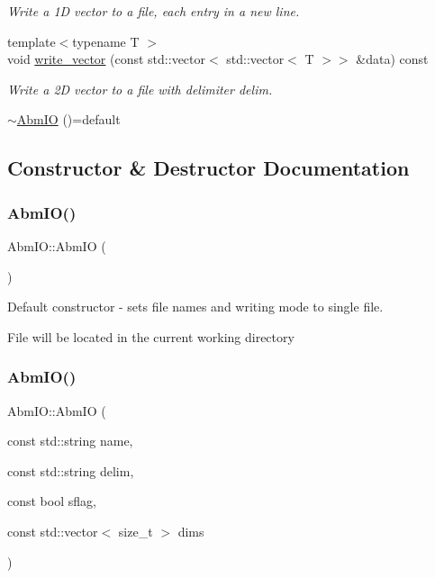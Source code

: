 \begin{DoxyCompactItemize}
\begin{DoxyCompactList}\small\item\em Write a 1D vector to a file, each entry in a new line. \end{DoxyCompactList}\item 
{\footnotesize template$<$typename T $>$ }\\void \hyperlink{classAbmIO_a3d630a2352e1e9e0337c419637f16060}{write\+\_\+vector} (const std\+::vector$<$ std\+::vector$<$ T $>$$>$ \&data) const
\begin{DoxyCompactList}\small\item\em Write a 2D vector to a file with delimiter delim. \end{DoxyCompactList}\item 
\hyperlink{classAbmIO_a134869d45f88440b1aa7580c8604a3d3}{$\sim$\+Abm\+IO} ()=default
\end{DoxyCompactItemize}


\subsection{Constructor \& Destructor Documentation}
\mbox{\label{classAbmIO_abe7ea84f8ad3a29b664a03343b058dde}} 
\subsubsection{\texorpdfstring{Abm\+I\+O()}{AbmIO()}\hspace{0.1cm}{\footnotesize\ttfamily [1/2]}}
{\footnotesize\ttfamily Abm\+I\+O\+::\+Abm\+IO (\begin{DoxyParamCaption}{ }\end{DoxyParamCaption})\hspace{0.3cm}{\ttfamily [default]}}



Default constructor -\/ sets file names and writing mode to single file. 

File will be located in the current working directory \mbox{\label{classAbmIO_a2aa3f0c48d1d213d9b6e615f5664ff3e}} 
\subsubsection{\texorpdfstring{Abm\+I\+O()}{AbmIO()}\hspace{0.1cm}{\footnotesize\ttfamily [2/2]}}
{\footnotesize\ttfamily Abm\+I\+O\+::\+Abm\+IO (\begin{DoxyParamCaption}\item[{const std\+::string}]{name,  }\item[{const std\+::string}]{delim,  }\item[{const bool}]{sflag,  }\item[{const std\+::vector$<$ size\+\_\+t $>$}]{dims }\end{DoxyParamCaption})\hspace{0.3cm}{\ttfamily [inline]}}



